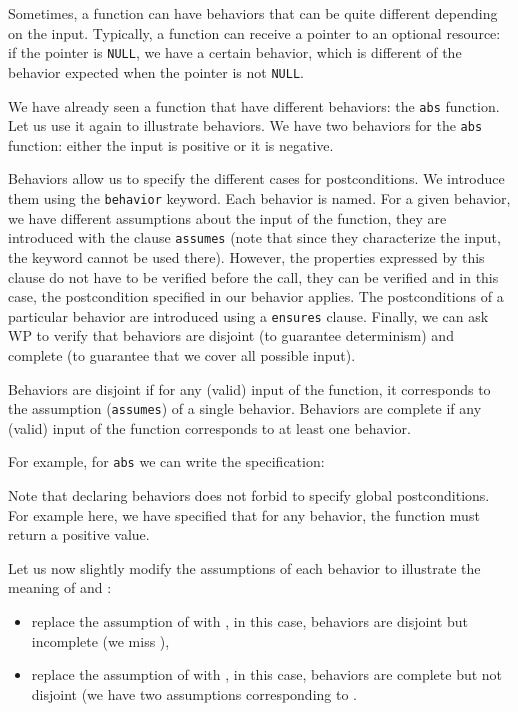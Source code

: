 Sometimes, a function can have behaviors that can be quite different
depending on the input. Typically, a function can receive a pointer to
an optional resource: if the pointer is \texttt{NULL}, we have a
certain behavior, which is different of the behavior expected when
the pointer is not \texttt{NULL}.

We have already seen a function that have different behaviors: the
\texttt{abs} function. Let us use it again to illustrate behaviors. We
have two behaviors for the \texttt{abs} function: either the input is
positive or it is negative.

Behaviors allow us to specify the different cases for postconditions. We
introduce them using the \texttt{behavior} keyword. Each behavior
is named. For a given behavior, we have different assumptions about the
input of the function, they are introduced with the clause
\texttt{assumes} (note that since they characterize the input, the
keyword  cannot be used there). However,
the properties expressed by this clause do not have to be verified before
the call, they can be verified and in this case, the postcondition
specified in our behavior applies. The postconditions of a particular
behavior are introduced using a \texttt{ensures} clause. Finally, we can ask WP
to verify that behaviors are disjoint (to guarantee determinism) and
complete (to guarantee that we cover all possible input).

Behaviors are disjoint if for any (valid) input of the function, it
corresponds to the assumption (\texttt{assumes}) of a single behavior.
Behaviors are complete if any (valid) input of the function corresponds
to at least one behavior.

For example, for \texttt{abs} we can write the specification:






Note that declaring behaviors does not forbid to specify global postconditions.
For example here, we have specified that for any behavior, the function must
return a positive value.



Let us now slightly modify the assumptions of each behavior to illustrate
the meaning of  and :
\begin{itemize}
\item
  replace the assumption of  with
  , in this case, behaviors are
  disjoint but incomplete (we miss ),
\item
  replace the assumption of  with
  , in this case, behaviors are
  complete but not disjoint (we have two assumptions corresponding
  to .
\end{itemize}


